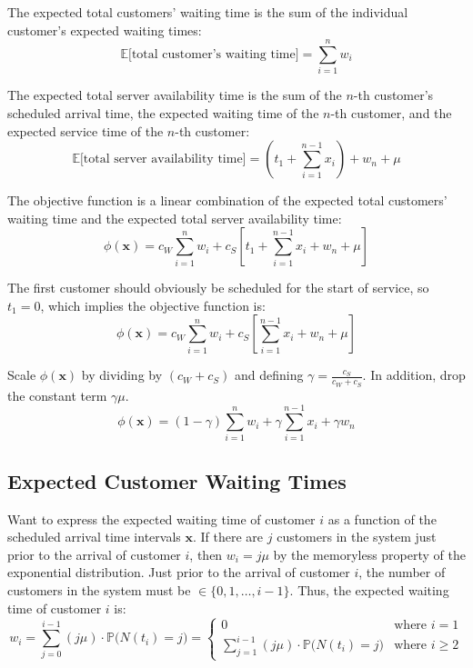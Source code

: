 The expected total customers' waiting time is the sum of the individual customer's expected waiting times:
\begin{equation}
	\mathbb{E} \Big[\text{total customer's waiting time} \Big] = \sum_{i = 1}^{n} w_{i}
\end{equation}

The expected total server availability time is the sum of the $n$-th customer's scheduled arrival time, the expected waiting time of the $n$-th customer, and the expected service time of the $n$-th customer:
\begin{equation}
	\mathbb{E} \Big[\text{total server availability time} \Big] = \left( t_{1} + \sum_{i = 1}^{n - 1} x_{i} \right) + w_{n} + \mu
\end{equation}

The objective function is a linear combination of the expected total customers' waiting time and the expected total server availability time:
\begin{equation}
	\phi (\mathbf{x}) = c_{W} \sum_{i = 1}^{n} w_{i} + c_{S} \left[ t_{1} + \sum_{i = 1}^{n - 1} x_{i} + w_{n} + \mu \right]
\end{equation}

The first customer should obviously be scheduled for the start of service, so $t_{1} = 0$, which implies the objective function is:
\begin{equation}
	\phi (\mathbf{x}) = c_{W} \sum_{i = 1}^{n} w_{i} + c_{S} \left[ \sum_{i = 1}^{n - 1} x_{i} + w_{n} + \mu \right]
\end{equation}

Scale $\phi (\mathbf{x})$ by dividing by $(c_{W} + c_{S})$ and defining $\gamma = \frac{c_{S}}{c_{W} + c_{S}}$. In addition, drop the constant term $\gamma \mu$.
\begin{equation}
	\phi (\mathbf{x}) = (1 - \gamma) \sum_{i = 1}^{n} w_{i} + \gamma \sum_{i = 1}^{n - 1} x_{i} + \gamma w_{n}
	\label{eqn:StaticObjective}
\end{equation}

\subsection{Expected Customer Waiting Times}

Want to express the expected waiting time of customer $i$ as a function of the scheduled arrival time intervals $\mathbf{x}$. If there are $j$ customers in the system just prior to the arrival of customer $i$, then $w_{i} = j \mu$ by the memoryless property of the exponential distribution. Just prior to the arrival of customer $i$, the number of customers in the system must be $\in \{ 0, 1, \ldots, i - 1 \}$. Thus, the expected waiting time of customer $i$ is:
\begin{equation}
	w_{i} = \sum_{j = 0}^{i - 1} (j \mu) \cdot \mathbb{P} \Big( N (t_{i}) = j \Big) = \begin{cases} 0 & \text{where $i = 1$} \\ \sum_{j = 1}^{i - 1} (j \mu) \cdot \mathbb{P} \Big( N (t_{i}) = j \Big) & \text{where $i \geq 2$} \end{cases}
	\label{eqn:StaticWaiting}
\end{equation}

